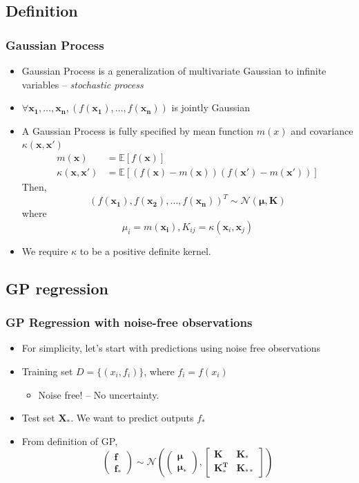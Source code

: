 \documentclass{beamer}
\begin{document}
\subsection{Definition}
\begin{frame}
	\frametitle{Gaussian Process}
	\begin{itemize}
		\item Gaussian Process is a generalization of multivariate Gaussian to infinite variables -- {\em stochastic process}
		\item $\forall \mathbf{x_1}, \ldots, \mathbf{x_n}, (f(\mathbf{x_1}), \ldots, f(\mathbf{x_n}))$ is jointly Gaussian
		\item A Gaussian Process is fully specified by mean function $m(x)$ and covariance $\kappa(\mathbf{x}, \mathbf{x'})$
		\begin{align*}
				m(\mathbf{x}) &= \mathbb{E}[f(\mathbf{x})] \\
				\kappa(\mathbf{\mathbf{x}}, \mathbf{\mathbf{x'}}) &= \mathbb{E}[(f(\mathbf{x})-m(\mathbf{x}))(f(\mathbf{x'})-m(\mathbf{x'}))]				
		\end{align*}	
		Then, 
		\[
			 (f(\mathbf{x_1}), f(\mathbf{x_2}), \ldots, f(\mathbf{x_n}))^T \sim \mathcal{N}(\bm{\mu}, \bm{K})			 
		\]
		where
		\[
			\mu_i = m(\mathbf{x_i}), K_{ij} = \kappa(\mathbf{x}_i, \mathbf{x}_j)
		\]
		\item We require $\kappa$ to be a positive definite kernel.
	\end{itemize}
\end{frame}
\subsection{GP regression}
\begin{frame}
	\frametitle{GP Regression with noise-free observations}
	\begin{itemize}
			\item For simplicity, let's start with predictions using noise free observations
			\item Training set $D=\{(x_i, f_i)\}$, where $f_i=f(x_i)$
				\begin{itemize}
					\item Noise free! -- No uncertainty.
				\end{itemize}
			\item Test set $\mathbf{X_*}$. We want to predict outputs $f_*$
			\item From definition of GP,
		\[\left( {\begin{array}{*{20}{c}}
			\bm{f}\\
			{\bm{f_*}}
			\end{array}} \right)\sim \mathcal{N}\left( {\left( {\begin{array}{*{20}{c}}
			\bm{\mu} \\
			{\bm{\mu _*}}
			\end{array}} \right),\left[ {\begin{array}{*{20}{c}}
			\bm{K}&{\bm{K_*}}\\
			\bm{K_*^T}&{\bm{K_{**}}}
			\end{array}} \right]} \right)\]
	\end{itemize}
\end{frame}
\end{document}
